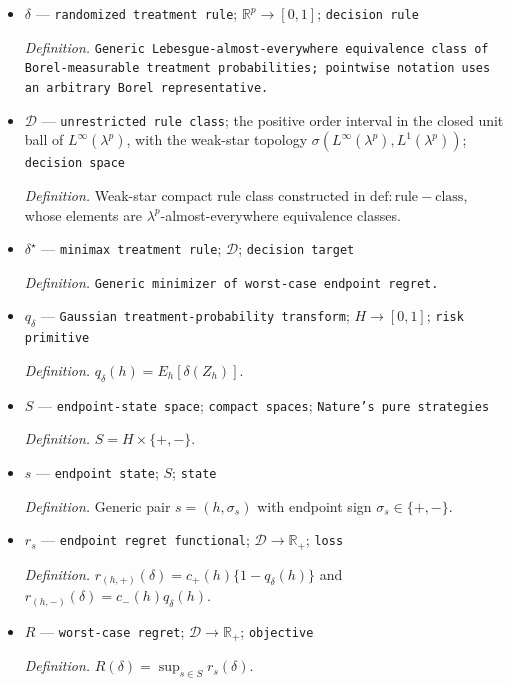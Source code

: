 \documentclass{article}
\begin{document}
\begin{itemize}
  \item \(\delta\) --- \texttt{randomized treatment rule}; \(\mathbb R^{p}\to[0,1]\); \texttt{decision rule}
  \par\smallskip\noindent\emph{Definition.} \texttt{Generic Lebesgue-\allowbreak{}almost-\allowbreak{}everywhere equivalence class of Borel-\allowbreak{}measurable treatment probabilities;\allowbreak{} pointwise notation uses an arbitrary Borel representative.}
  \item \(\mathcal D\) --- \texttt{unrestricted rule class}; the positive order interval in the closed unit ball of \(L^{\infty}(\lambda^p)\), with the weak-star topology \(\sigma(L^{\infty}(\lambda^p),L^1(\lambda^p))\); \texttt{decision space}
  \par\smallskip\noindent\emph{Definition.} Weak-star compact rule class constructed in \(\mathrm{def:rule-class}\), whose elements are \(\lambda^p\)-almost-everywhere equivalence classes.
  \item \(\delta^{\star}\) --- \texttt{minimax treatment rule}; \(\mathcal D\); \texttt{decision target}
  \par\smallskip\noindent\emph{Definition.} \texttt{Generic minimizer of worst-\allowbreak{}case endpoint regret.}
  \item \(q_{\delta}\) --- \texttt{Gaussian treatment-\allowbreak{}probability transform}; \(H\to[0,1]\); \texttt{risk primitive}
  \par\smallskip\noindent\emph{Definition.} \(q_{\delta}(h)=E_h[\delta(Z_h)]\).
  \item \(S\) --- \texttt{endpoint-\allowbreak{}state space}; \texttt{compact spaces}; \texttt{Nature's pure strategies}
  \par\smallskip\noindent\emph{Definition.} \(S=H\times\{+,-\}\).
  \item \(s\) --- \texttt{endpoint state}; \(S\); \texttt{state}
  \par\smallskip\noindent\emph{Definition.} Generic pair \(s=(h,\sigma_s)\) with endpoint sign \(\sigma_s\in\{+,-\}\).
  \item \(r_s\) --- \texttt{endpoint regret functional}; \(\mathcal D\to\mathbb R_{+}\); \texttt{loss}
  \par\smallskip\noindent\emph{Definition.} \(r_{(h,+)}(\delta)=c_{+}(h)\{1-q_{\delta}(h)\}\) and \(r_{(h,-)}(\delta)=c_{-}(h)q_{\delta}(h)\).
  \item \(R\) --- \texttt{worst-\allowbreak{}case regret}; \(\mathcal D\to\mathbb R_{+}\); \texttt{objective}
  \par\smallskip\noindent\emph{Definition.} \(R(\delta)=\sup_{s\in S}r_s(\delta)\).

\end{itemize}
\end{document}
